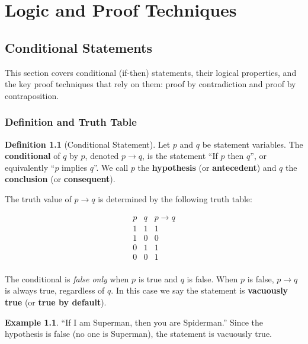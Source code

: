\documentclass[11pt, a4paper, notitlepage]{report}
\theoremstyle{definition}
\newtheorem{definition}[theorem]{Definition}
\newtheorem{example}[theorem]{Example}
\theoremstyle{remark}
\begin{document}
\chapter{Logic and Proof Techniques}
\label{chap:logic}

\section{Conditional Statements}
\label{sec:conditional}

This section covers conditional (if-then) statements, their logical properties, and the key
proof techniques that rely on them: proof by contradiction and proof by contraposition.

\subsection{Definition and Truth Table}

\begin{definition}[Conditional Statement]
\label{def:conditional}
Let $p$ and $q$ be statement variables. The \textbf{conditional} of $q$ by $p$, denoted
$p \to q$, is the statement ``If $p$ then $q$'', or equivalently ``$p$ implies $q$''. We
call $p$ the \textbf{hypothesis} (or \textbf{antecedent}) and $q$ the \textbf{conclusion}
(or \textbf{consequent}).
\end{definition}

The truth value of $p \to q$ is determined by the following truth table:

\[
\begin{array}{cc|c}
  p & q & p \to q \\ \hline
  1 & 1 & 1 \\
  1 & 0 & 0 \\
  0 & 1 & 1 \\
  0 & 0 & 1 \\
\end{array}
\]

The conditional is \emph{false only} when $p$ is true and $q$ is false. When $p$ is false,
$p \to q$ is always true, regardless of $q$. In this case we say the statement is
\textbf{vacuously true} (or \textbf{true by default}).

\begin{example}
``If I am Superman, then you are Spiderman.'' Since the hypothesis is false (no one is
Superman), the statement is vacuously true.
\end{example}
\end{document}
